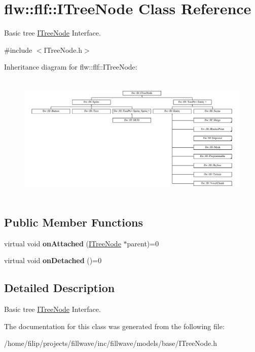 \hypertarget{classflw_1_1flf_1_1ITreeNode}{}\section{flw\+:\+:flf\+:\+:I\+Tree\+Node Class Reference}
\label{classflw_1_1flf_1_1ITreeNode}


Basic tree \hyperlink{classflw_1_1flf_1_1ITreeNode}{I\+Tree\+Node} Interface.  




{\ttfamily \#include $<$I\+Tree\+Node.\+h$>$}

Inheritance diagram for flw\+:\+:flf\+:\+:I\+Tree\+Node\+:\begin{figure}[H]
\begin{center}
\leavevmode
\includegraphics[height=6.160000cm]{classflw_1_1flf_1_1ITreeNode}
\end{center}
\end{figure}
\subsection*{Public Member Functions}
\begin{DoxyCompactItemize}
\item 
\mbox{\label{classflw_1_1flf_1_1ITreeNode_a983181e4935b547e38b7234410324f90}} 
virtual void {\bfseries on\+Attached} (\hyperlink{classflw_1_1flf_1_1ITreeNode}{I\+Tree\+Node} $\ast$parent)=0
\item 
\mbox{\label{classflw_1_1flf_1_1ITreeNode_a2452e98a3718088c87993ac30735f190}} 
virtual void {\bfseries on\+Detached} ()=0
\end{DoxyCompactItemize}


\subsection{Detailed Description}
Basic tree \hyperlink{classflw_1_1flf_1_1ITreeNode}{I\+Tree\+Node} Interface. 

The documentation for this class was generated from the following file\+:\begin{DoxyCompactItemize}
\item 
/home/filip/projects/fillwave/inc/fillwave/models/base/I\+Tree\+Node.\+h\end{DoxyCompactItemize}
